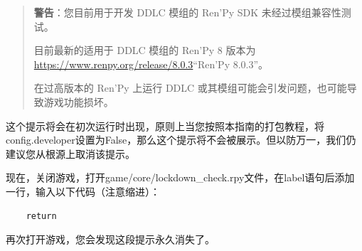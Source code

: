 \begin{quote}
    \textbf{警告}：您目前用于开发 DDLC 模组的 Ren'Py SDK 未经过模组兼容性测试。

    目前最新的适用于 DDLC 模组的 Ren'Py 8 版本为\url{https://www.renpy.org/release/8.0.3}“Ren'Py 8.0.3”。
    
    在过高版本的 Ren'Py 上运行 DDLC 或其模组可能会引发问题，也可能导致游戏功能损坏。
\end{quote}

这个提示将会在初次运行时出现，原则上当您按照本指南的打包教程，将config.developer设置为False，那么这个提示将不会被展示。但以防万一，我们仍建议您从根源上取消该提示。

现在，关闭游戏，打开game/core/lockdown\_check.rpy文件，在label语句后添加一行，输入以下代码（注意缩进）：
\begin{lstlisting}
    return
\end{lstlisting}

再次打开游戏，您会发现这段提示永久消失了。
